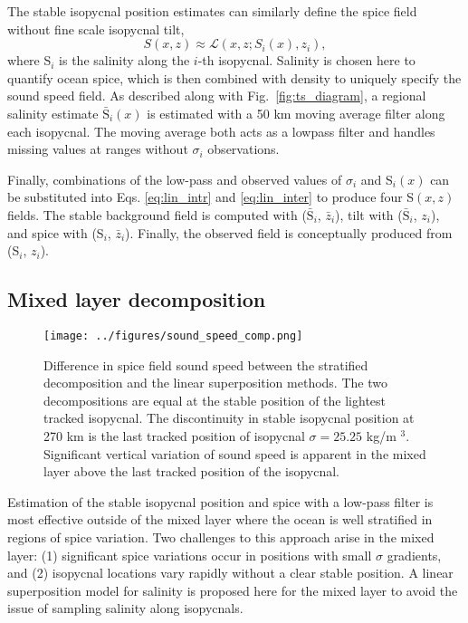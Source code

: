 \documentclass[preprint,NumberedRefs]{JASA}
\begin{document}
The stable isopycnal position estimates can similarly define the spice field without fine scale isopycnal tilt,
\begin{equation}
    S(x, z)\approx\mathcal{L}(x, z; S_i(x), z_i),
    \label{eq:lin_inter}
\end{equation}
where S$_i$ is the salinity along the $i$-th isopycnal. Salinity is chosen here to quantify ocean spice, which is then combined with density to uniquely specify the sound speed field\citep{TEOS10}. As described along with Fig.~\ref{fig:ts_diagram}, a regional salinity estimate $\bar{\textrm{S}}_i(x)$ is estimated with a 50 km moving average filter along each isopycnal. The moving average both acts as a lowpass filter and handles missing values at ranges without $\sigma_i$ observations.

Finally, combinations of the low-pass and observed values of $\sigma_i$ and S$_i(x)$ can be substituted into Eqs. \eqref{eq:lin_intr} and \eqref{eq:lin_inter} to produce four S$(x,z)$ fields. The stable background field is computed with ($\bar{\textrm{S}}_i$, $\bar{z}_i$), tilt with ($\bar{\textrm{S}}_i$, $z_i$), and spice with (S$_i$, $\bar{z}_i$). Finally, the observed field is conceptually produced from (S$_i$, $z_i$).

\subsection{Mixed layer decomposition}\label{ssec:ml_decomp}
\begin{figure}
\texttt{[image: ../figures/sound\_speed\_comp.png]}
    \caption{\label{fig:c_diff}{Difference in spice field sound speed between the stratified decomposition and the linear superposition methods. The two decompositions are equal at the stable position of the lightest tracked isopycnal. The discontinuity in stable isopycnal position at 270 km is the last tracked position of isopycnal $\sigma=25.25$ kg/m $^3$. Significant vertical variation of sound speed is apparent in the mixed layer above the last tracked position of the isopycnal.}}
\end{figure}

Estimation of the stable isopycnal position and spice with a low-pass filter is most effective outside of the mixed layer where the ocean is well stratified in regions of spice variation. Two challenges to this approach arise in the mixed layer: (1) significant spice variations occur in positions with small $\sigma$ gradients, and (2) isopycnal locations vary rapidly without a clear stable position. A linear superposition model for salinity is proposed here for the mixed layer to avoid the issue of sampling salinity along isopycnals.
\end{document}
